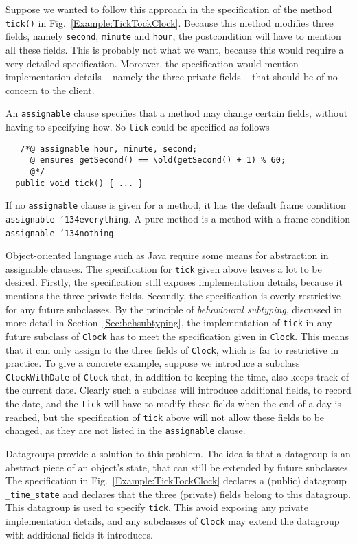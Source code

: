 \documentclass{llncs}
\def\old{\texttt{\char'134old}}
\def\everything{\texttt{\char'134everything}}
\def\nothing{\texttt{\char'134nothing}}
\begin{document}
Suppose we wanted to follow this approach in the specification 
of the method \texttt{tick()} in Fig.~\ref{Example:TickTockClock}.
Because this method modifies three fields, namely
\texttt{second}, \texttt{minute} and \texttt{hour}, 
the postcondition will have to mention all these fields.
This is probably not what we want, because this would require a very
detailed specification. Moreover, the specification would mention implementation 
details -- namely the three private fields -- that should be of no concern to the 
client.

An  \texttt{assignable} clause specifies that a method may change certain 
fields, without having to specifying how.
So \texttt{tick} could be specified as follows
\begin{verbatim}
   /*@ assignable hour, minute, second;
     @ ensures getSecond() == \old(getSecond() + 1) % 60;
     @*/
  public void tick() { ... }
\end{verbatim}
If no \texttt{assignable} clause is given for a method, it has the
default frame condition \texttt{assignable \everything}.
A pure method is a method with a frame condition \texttt{assignable \nothing}.

Object-oriented language such as Java require some means for abstraction in 
assignable clauses.
The specification for \texttt{tick} given above leaves a lot to be desired.
Firstly, the specification still exposes implementation details,
because it mentions the three private fields.
Secondly, the specification is overly restrictive for any future subclasses.
By the principle of \emph{behavioural subtyping}, discussed in more detail
in Section~\ref{Sec:behsubtyping}, the implementation of \texttt{tick} in any future
subclass of \texttt{Clock} has to meet the specification given in \texttt{Clock}.
This means that it can only assign to the three fields of \texttt{Clock},
which is far to restrictive in practice.
To give a concrete example, suppose we introduce a subclass \texttt{ClockWithDate} 
of \texttt{Clock} that, in addition to keeping the time, also keeps track of the 
current date.  Clearly such a subclass will introduce additional fields, to record 
the date, and the \texttt{tick} will have to modify these fields when the end
of a day is reached,  but the specification of \texttt{tick} above will not allow 
these fields to be changed, as they are not listed in the \texttt{assignable} clause.

Datagroups \cite{Leino98} provide a solution to 
this problem. The idea is that a datagroup is an abstract piece of an object's
state, that can still be extended by future subclasses.
The specification in Fig.~\ref{Example:TickTockClock} declares a (public) datagroup
\texttt{\_time\_state} and declares that the three (private) fields belong
to this datagroup. This datagroup is used to specify \texttt{tick}.
This avoid exposing any private implementation details, and
any subclasses of \texttt{Clock} may extend the datagroup with
additional fields it introduces.
\end{document}
